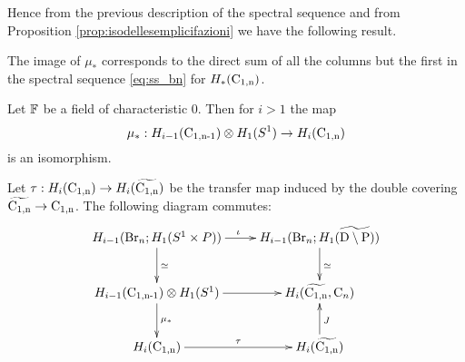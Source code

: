 Hence from the previous description of the spectral sequence and from Proposition \ref{prop:isodellesemplicifazioni} we have the following result.
\begin{prop} \label{prop:image_mu}
The image of $\mu_*$ corresponds to the direct sum of all the columns but the first in the spectral sequence \eqref{eq:ss_bn} for $H_*(\operatorname{C_{1,n}})$.
\end{prop} 
\begin{rem}\label{rem:Q_mu}
Let $\mathbb{F}$ be a field of characteristic $0$. Then for $i>1$ the map
$$
\mu_*: H_{i-1}(\operatorname{C_{1,n-1}}) \otimes H_1(S^1) \to H_i(\operatorname{C_{1,n}})
$$
is an isomorphism. 
\end{rem}
%
\begin{prop}\label{prop:tau1}
Let $\tau: H_i(\operatorname{C_{1,n}}) \to H_i(\widetilde{\operatorname{C_{1,n}}})$ be the transfer map induced by the double covering $\widetilde{\operatorname{C_{1,n}}} \to \operatorname{C_{1,n}}$.
The following diagram commutes:
\begin{equation}\label{diag:trerighe}
\begin{tabular}{c}
\xymatrix @R=2pc @C=2pc {
	H_{i-1}(\Br_n; H_1(S^1 \times P)) \ar[r]^\iota \ar[d]^\simeq & H_{i-1}(\Br_n; H_1(\ddiskP))\ar[d]^\simeq  \\
	H_{i-1}(\confm{n-1}) \otimes H_1(S^1) \ar[d]^{\mu_*} \ar[r] & H_i(\confmd{n}, \conf_n) \\
	H_i(\confm{n}) \ar[r]^{\tau} &H_i(\confmd{n})  \ar[u]_J
}
\end{tabular}
\end{equation}
\end{prop}

